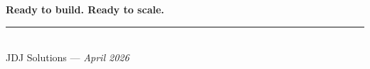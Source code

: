 \documentclass[12pt,a4paper]{report}
\begin{document}
\vspace{1cm}
\begin{center}
  {\large\bfseries\color{primary} Ready to build. Ready to scale.}\\[0.3cm]
  {\color{accent} \rule{8cm}{1.5pt}}\\[0.5cm]
  {\normalsize JDJ Solutions — \textit{April 2026}}
\end{center}

\end{document}
